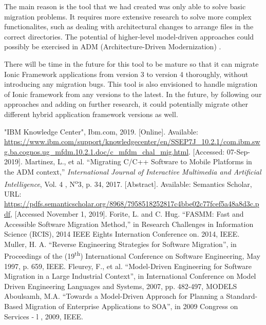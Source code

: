 \documentclass[conference]{IEEEtran}
\begin{document}
The main reason is the tool that we had created was only able to solve basic migration problems. 
It requires more extensive research to solve more complex functionalites, such as dealing with 
architectural changes to arrange files in the correct directories. The potential of
higher-level model-driven approaches could possibly be exercised in ADM (Architecture-Driven Modernization) \cite{b2}. 

There will be time in the future for this tool to be mature so that it can migrate Ionic Framework applications from version 
3 to version 4 thoroughly, without introducing any migration bugs.
This tool is also envisioned to handle migration of Ionic framework from 
any versions to the latest. In the future, by following our approaches and adding on further research, 
it could potentially migrate other different hybrid application framework versions as well.

\begin{thebibliography}{00}
 "IBM Knowledge Center", Ibm.com, 2019. [Online]. Available: \url{https://www.ibm.com/support/knowledgecenter/en/SSEP7J_10.2.1/com.ibm.swg.ba.cognos.ug_mfdm.10.2.1.doc/c_mfdm_chal_mig.html}. [Accessed: 07-Sep-2019].
 Martinez, L., et al. ``Migrating C/C++ Software to Mobile Platforms in the ADM context,'' \textit{International Journal of Interactive Multimedia and Artificial Intelligence}, Vol. 4 , N\textsuperscript{o}3, p. 34, 2017. [Abstract]. Available: Semantics Scholar, URL: \url{https://pdfs.semanticscholar.org/8968/7958518252817c4bbe02c77fcef5a48a8d3c.pdf}, [Accessed November 1, 2019].
 Forite, L. and C. Hug. ``FASMM: Fast and Accessible Software Migration Method,'' in Research Challenges in Information Science (RCIS), 2014 IEEE Eights Internation Conference on. 2014, IEEE.
 Muller, H. A. ``Reverse Engineering Strategies for Software Migration'', in Proceedings of the (19\textsuperscript{th}) International Conference on Software Engineering, May 1997, p. 659, IEEE.
 Fleurey, F., et al. ``Model-Driven Engineering for Software Migration in a Large Industrial Context'', in International Conference on Model Driven Engineering Languages and Systems, 2007, pp. 482-497, MODELS
 Aboulsamh, M.A. ``Towards a Model-Driven Approach for Planning a Standard-Based Migration of Enterprise Applications to SOA'', in 2009 Congress on Services - l , 2009, IEEE.

\end{thebibliography}
\vspace{12pt}
\color{red}
\end{document}
